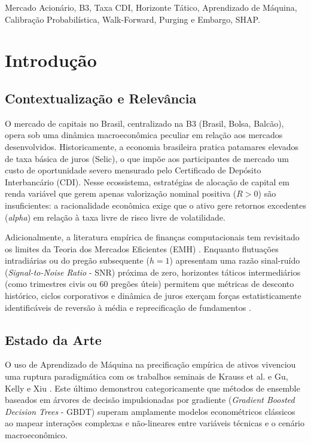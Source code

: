 \documentclass[conference]{IEEEtran}
\begin{document}
\begin{IEEEkeywords}
Mercado Acionário, B3, Taxa CDI, Horizonte Tático, Aprendizado de Máquina, Calibração Probabilística, Walk-Forward, Purging e Embargo, SHAP.
\end{IEEEkeywords}

\section{Introdução}

\subsection{Contextualização e Relevância}
O mercado de capitais no Brasil, centralizado na B3 (Brasil, Bolsa, Balcão), opera sob uma dinâmica macroeconômica peculiar em relação aos mercados desenvolvidos. Historicamente, a economia brasileira pratica patamares elevados de taxa básica de juros (Selic), o que impõe aos participantes de mercado um custo de oportunidade severo mensurado pelo Certificado de Depósito Interbancário (CDI). Nesse ecossistema, estratégias de alocação de capital em renda variável que gerem apenas valorização nominal positiva ($R > 0$) são insuficientes: a racionalidade econômica exige que o ativo gere retornos excedentes (\textit{alpha}) em relação à taxa livre de risco livre de volatilidade.

Adicionalmente, a literatura empírica de finanças computacionais tem revisitado os limites da Teoria dos Mercados Eficientes (EMH) \cite{fama1970efficient}. Enquanto flutuações intradiárias ou do pregão subsequente ($h = 1$) apresentam uma razão sinal-ruído (\textit{Signal-to-Noise Ratio} - SNR) próxima de zero, horizontes táticos intermediários (como trimestres civis ou 60 pregões úteis) permitem que métricas de desconto histórico, ciclos corporativos e dinâmica de juros exerçam forças estatisticamente identificáveis de reversão à média e reprecificação de fundamentos \cite{deprado2018advances, gu2020empirical}.

\subsection{Estado da Arte}
O uso de Aprendizado de Máquina na precificação empírica de ativos vivenciou uma ruptura paradigmática com os trabalhos seminais de Krauss et al. \cite{krauss2017deep} e Gu, Kelly e Xiu \cite{gu2020empirical}. Este último demonstrou categoricamente que métodos de ensemble baseados em árvores de decisão impulsionadas por gradiente (\textit{Gradient Boosted Decision Trees} - GBDT) superam amplamente modelos econométricos clássicos ao mapear interações complexas e não-lineares entre variáveis técnicas e o cenário macroeconômico.
\end{document}
